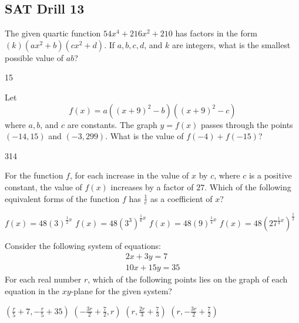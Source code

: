
\subsection*{SAT Drill 13}

\question[1]
The given quartic function $54x^4 + 216x^2 + 210$ has factors in the form $(k)(a x^2 + b)(c x^2 + d)$. If $a, b, c, d$, and $k$ are integers, what is the smallest possible value of $ab$?
\begin{solution}
15
\end{solution}

\question[1]
Let
\[
  f(x) = a\left((x+9)^2 - b\right)\left((x+9)^2 - c\right)
\]
where $a, b$, and $c$ are constants. The graph $y = f(x)$ passes through the points $(-14, 15)$ and $(-3, 299)$. What is the value of $f(-4) + f(-15)$?
\begin{solution}
314
\end{solution}

\question[1]
For the function $f$, for each increase in the value of $x$ by $c$, where $c$ is a positive constant, the value of $f(x)$ increases by a factor of $27$. Which of the following equivalent forms of the function $f$ has $\frac{1}{c}$ as a coefficient of $x$?
\begin{choices}
  \choice $f(x) = 48(3)^{\frac{1}{2}x}$
  \CorrectChoice $f(x) = 48\left(3^3\right)^{\frac{1}{6}x}$
  \choice $f(x) = 48(9)^{\frac{1}{4}x}$
  \choice $f(x) = 48\left(27^{\frac{1}{3}x}\right)^{\frac{1}{2}}$
\end{choices}



\newpage




\question[1]
Consider the following system of equations:
\[
  \begin{gathered}
  2x + 3y = 7 \\
  10x + 15y = 35
  \end{gathered}
\]
For each real number $r$, which of the following points lies on the graph of each equation in the $xy$-plane for the given system?
\begin{choices}
  \choice $\left(\frac{r}{5}+7,-\frac{r}{5}+35\right)$
  \CorrectChoice $\left(-\frac{3r}{2}+\frac{7}{2}, r\right)$
  \choice $\left(r, \frac{2r}{3}+\frac{7}{3}\right)$
  \choice $\left(r,-\frac{3r}{2}+\frac{7}{2}\right)$
\end{choices}

